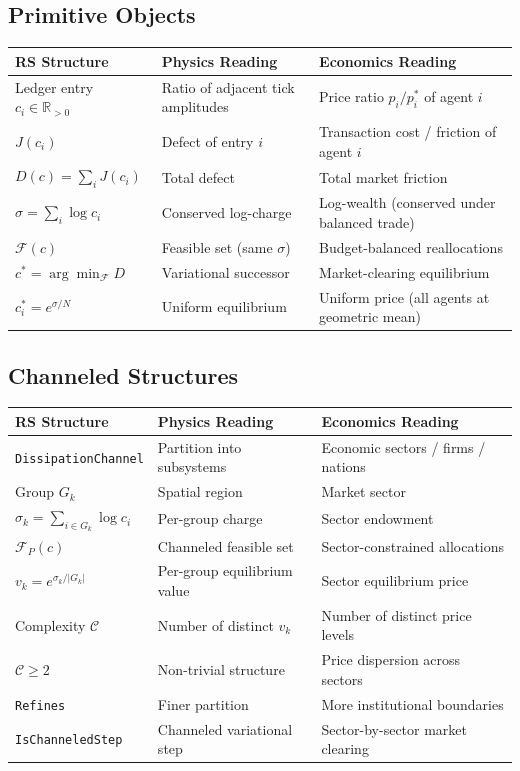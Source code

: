 \documentclass[11pt,a4paper]{article}
\theoremstyle{plain}
\theoremstyle{definition}
\theoremstyle{remark}
\newcommand{\R}{\mathbb{R}}
\newcommand{\Jcost}{J}
\newcommand{\F}{\mathcal{F}}
\begin{document}
\subsection{Primitive Objects}

\begin{center}
\renewcommand{\arraystretch}{1.3}
\begin{tabular}{@{}p{4cm}p{5cm}p{5cm}@{}}
\toprule
\textbf{RS Structure} & \textbf{Physics Reading} & \textbf{Economics Reading} \\
\midrule
Ledger entry $c_i \in \R_{>0}$ & Ratio of adjacent tick amplitudes & Price ratio $p_i / p_i^*$ of agent $i$ \\
$\Jcost(c_i)$ & Defect of entry $i$ & Transaction cost / friction of agent $i$ \\
$D(c) = \sum_i \Jcost(c_i)$ & Total defect & Total market friction \\
$\sigma = \sum_i \log c_i$ & Conserved log-charge & Log-wealth (conserved under balanced trade) \\
$\F(c)$ & Feasible set (same $\sigma$) & Budget-balanced reallocations \\
$c^* = \arg\min_\F D$ & Variational successor & Market-clearing equilibrium \\
$c_i^* = e^{\sigma/N}$ & Uniform equilibrium & Uniform price (all agents at geometric mean) \\
\bottomrule
\end{tabular}
\end{center}

\subsection{Channeled Structures}

\begin{center}
\renewcommand{\arraystretch}{1.3}
\begin{tabular}{@{}p{4cm}p{5cm}p{5cm}@{}}
\toprule
\textbf{RS Structure} & \textbf{Physics Reading} & \textbf{Economics Reading} \\
\midrule
\texttt{DissipationChannel} & Partition into subsystems & Economic sectors / firms / nations \\
Group $G_k$ & Spatial region & Market sector \\
$\sigma_k = \sum_{i \in G_k} \log c_i$ & Per-group charge & Sector endowment \\
$\F_P(c)$ & Channeled feasible set & Sector-constrained allocations \\
$v_k = e^{\sigma_k/|G_k|}$ & Per-group equilibrium value & Sector equilibrium price \\
Complexity $\mathcal{C}$ & Number of distinct $v_k$ & Number of distinct price levels \\
$\mathcal{C} \ge 2$ & Non-trivial structure & Price dispersion across sectors \\
\texttt{Refines} & Finer partition & More institutional boundaries \\
\texttt{IsChanneledStep} & Channeled variational step & Sector-by-sector market clearing \\
\bottomrule
\end{tabular}
\end{center}
\end{document}

